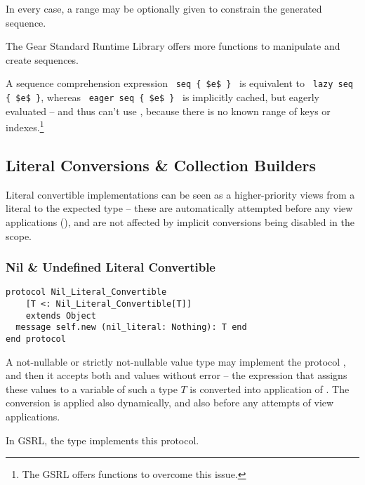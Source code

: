 In every case, a range may be optionally given to constrain the generated sequence. 

The Gear Standard Runtime Library offers more functions to manipulate and create sequences. 

A sequence comprehension expression ~\lstinline!seq { $e$ }!~ is equivalent to ~\lstinline!lazy seq { $e$ }!, whereas ~\lstinline!eager seq { $e$ }!~ is implicitly cached, but eagerly evaluated -- and thus can't use , because there is no known range of keys or indexes.\footnote{The GSRL offers functions to overcome this issue.}





\subsection{Literal Conversions \& Collection Builders}
\label{sec:literal-conversions}

Literal convertible implementations can be seen as a higher-priority views from a literal to the expected type -- these are automatically attempted before any view applications (), and are not affected by implicit conversions being disabled in the scope.





\subsubsection{Nil \& Undefined Literal Convertible}

\begin{lstlisting}
protocol Nil_Literal_Convertible 
    [T <: Nil_Literal_Convertible[T]] 
    extends Object
  message self.new (nil_literal: Nothing): T end
end protocol
\end{lstlisting}

A not-nullable or strictly not-nullable value type may implement the protocol , and then it accepts both  and  values without error -- the expression that assigns these values to a variable of such a type $T$ is converted into application of . The conversion is applied also dynamically, and also before any attempts of view applications. 

In GSRL, the  type implements this protocol. 


